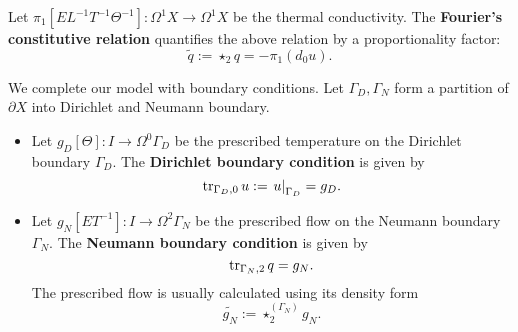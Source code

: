 \begin{discussion}
\begin{itemize}
      Let $\pi_1 [E L^{-1} T^{-1} \Theta^{-1}] \colon \Omega^1 X \to \Omega^1 X$
      be the thermal conductivity.
      The \textbf{Fourier's constitutive relation}
      quantifies the above relation by a proportionality factor:
      \begin{equation}
        \tilde{q} := \star_2 q = - \pi_1 (d_0 u).
      \end{equation}
  \end{itemize}
  We complete our model with boundary conditions.
  Let $\Gamma_D, \Gamma_N$ form a partition of $\partial X$
  into Dirichlet and Neumann boundary.
  \begin{itemize}
    \item
      Let $g_D [\Theta] \colon I \to \Omega^0 \Gamma_D$
      be the prescribed temperature on the Dirichlet boundary $\Gamma_D$.
      The \textbf{Dirichlet boundary condition} is given by
      \begin{equation}
        \mathop{\rm tr}\nolimits_{\Gamma_D, 0} u := \left. u \right|_{\Gamma_D} = g_D.
      \end{equation}
    \item
      Let $g_N [E T^{-1}] \colon I \to \Omega^2 \Gamma_N$
      be the prescribed flow on the Neumann boundary $\Gamma_N$.
      The \textbf{Neumann boundary condition} is given by
      \begin{equation}
        \mathop{\rm tr}\nolimits_{\Gamma_N, 2} q = g_N.
      \end{equation}
      The prescribed flow is usually calculated using its density form
      \begin{equation}
        \widetilde{g_N} := \star^{(\Gamma_N)}_2 g_N.
      \end{equation}
  \end{itemize}
\end{discussion}
